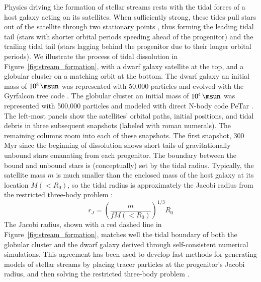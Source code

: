 \documentclass[final,5p,times,twocolumn,authoryear]{elsarticle}
\begin{document}
Physics driving the formation of stellar streams rests with the tidal forces of a host galaxy acting on its satellites.
When sufficiently strong, these tides pull stars out of the satellite through two stationary points \citep{bt:2008}, thus forming the leading tidal tail (stars with shorter orbital periods speeding ahead of the progenitor) and the trailing tidal tail (stars lagging behind the progenitor due to their longer orbital periods).
We illustrate the process of tidal dissolution in Figure~\ref{fig:stream_formation}, with a dwarf galaxy satellite at the top, and a globular cluster on a matching orbit at the bottom.
The dwarf galaxy  an initial mass of $10^8\,\unit{\msun}$ was represented with 50,000 particles and evolved with the Gyrfalcon tree code \citep{dehnen:2014}.
The globular cluster  an initial mass of $10^4\,\unit{\msun}$ was represented with 500,000 particles and modeled with direct N-body code PeTar \citep{wang:2020}.
The left-most panels show the satellites' orbital paths, initial positions, and tidal debris in three subsequent snapshots (labeled with roman numerals).
The remaining columns zoom into each of these snapshots.
The first snapshot, 300\,\unit{Myr} since the beginning of dissolution shows short tails of gravitationally unbound stars emanating from each progenitor.
The boundary between the bound and unbound stars is (conceptually) set by the tidal radius.
Typically, the satellite mass $m$ is much smaller than the enclosed mass of the host galaxy at its location $M(<R_0)$, so the tidal radius is approximately the Jacobi radius from the restricted three-body problem \citep[][]{szebehely:1967, valtonen:2006}:
\begin{equation}
r_J = \left(\frac{m}{fM(<R_0)}\right)^{1/3} R_0
\end{equation}
The Jacobi radius, shown with a red dashed line in Figure~\ref{fig:stream_formation}, matches well the tidal boundary of both the globular cluster and the dwarf galaxy derived through self-consistent numerical simulations.
This agreement has been used to develop fast methods for generating models of stellar streams by placing tracer particles at the progenitor's Jacobi radius, and then solving the restricted three-body problem \citep[the so-called \emph{particle-spray methods};][]{varghese:2011, lane:2012, kupper:2012, bonaca:2014, gibbons:2014, fardal:2015}.
\end{document}
